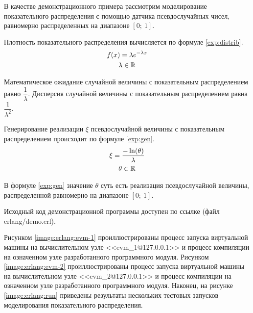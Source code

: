 
В качестве демонстрационного примера рассмотрим моделирование показательного распределения с помощью датчика псевдослучайных чисел, равномерно распределенных на диапазоне $[0 ;~ 1]$.

Плотность показательного распределения вычисляется по формуле \eqref{exp:distrib}.
\begin{gather}
	f(x) = \lambda e^{- \lambda x} \label{exp:distrib} \\
	\lambda \in \mathbb{R} \notag
\end{gather}

Математическое ожидание случайной величины с показательным распределением равно $\dfrac{1}{\lambda}$. Дисперсия случайной величины с показательным распределением равна $\dfrac{1}{\lambda ^ 2}$.

Генерирование реализации $\xi$ псевдослучайной величины с показательным распределением происходит по формуле \eqref{exp:gen}.
\begin{gather}
	\xi = \frac{- \ln(\theta)}{\lambda} \label{exp:gen} \\
	\theta \in \mathbb{R} \notag
\end{gather}

В формуле \eqref{exp:gen} значение $\theta$ суть есть реализация псевдослучайной величины, распределенной равномерно на диапазоне $[0 ;~ 1]$.

Исходный код демонстрационной программы доступен по ссылке \cite{code} (файл erlang/demo.erl).

Рисунком \ref{image:erlang:evm-1} проиллюстрированы процесс запуска виртуальной машины на вычислительном узле <<evm\_1@127.0.0.1>> и процесс компиляции на означенном узле разработанного программного модуля. Рисунком \ref{image:erlang:evm-2} проиллюстрированы процесс запуска виртуальной машины на вычислительном узле <<evm\_2@127.0.0.1>> и процесс компиляции на означенном узле разработанного программного модуля. Наконец, на рисунке \ref{image:erlang:run} приведены результаты нескольких тестовых запусков моделирования показательного распределения.


